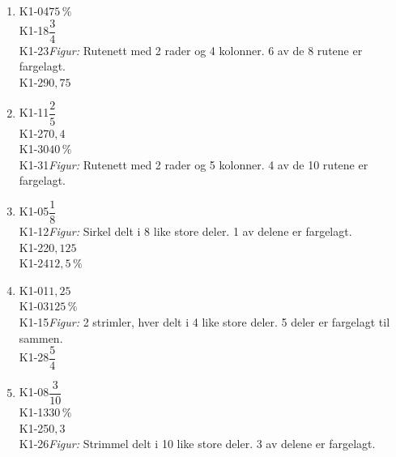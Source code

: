 \documentclass[11pt,a4paper]{article}
\begin{document}
\begin{enumerate}[leftmargin=1.6em, itemsep=0.7em]
\item \begin{minipage}[t]{\linewidth}\textsf{\small K1-04}\quad $75\,\%$ \\ \textsf{\small K1-18}\quad $\dfrac{3}{4}$ \\ \textsf{\small K1-23}\quad \emph{Figur:} Rutenett med 2 rader og 4 kolonner. 6 av de 8 rutene er fargelagt. \\ \textsf{\small K1-29}\quad $0{,}75$\end{minipage}
\item \begin{minipage}[t]{\linewidth}\textsf{\small K1-11}\quad $\dfrac{2}{5}$ \\ \textsf{\small K1-27}\quad $0{,}4$ \\ \textsf{\small K1-30}\quad $40\,\%$ \\ \textsf{\small K1-31}\quad \emph{Figur:} Rutenett med 2 rader og 5 kolonner. 4 av de 10 rutene er fargelagt.\end{minipage}
\item \begin{minipage}[t]{\linewidth}\textsf{\small K1-05}\quad $\dfrac{1}{8}$ \\ \textsf{\small K1-12}\quad \emph{Figur:} Sirkel delt i 8 like store deler. 1 av delene er fargelagt. \\ \textsf{\small K1-22}\quad $0{,}125$ \\ \textsf{\small K1-24}\quad $12{,}5\,\%$\end{minipage}
\item \begin{minipage}[t]{\linewidth}\textsf{\small K1-01}\quad $1{,}25$ \\ \textsf{\small K1-03}\quad $125\,\%$ \\ \textsf{\small K1-15}\quad \emph{Figur:} 2 strimler, hver delt i 4 like store deler. 5 deler er fargelagt til sammen. \\ \textsf{\small K1-28}\quad $\dfrac{5}{4}$\end{minipage}
\item \begin{minipage}[t]{\linewidth}\textsf{\small K1-08}\quad $\dfrac{3}{10}$ \\ \textsf{\small K1-13}\quad $30\,\%$ \\ \textsf{\small K1-25}\quad $0{,}3$ \\ \textsf{\small K1-26}\quad \emph{Figur:} Strimmel delt i 10 like store deler. 3 av delene er fargelagt.\end{minipage}

\end{enumerate}
\end{document}
